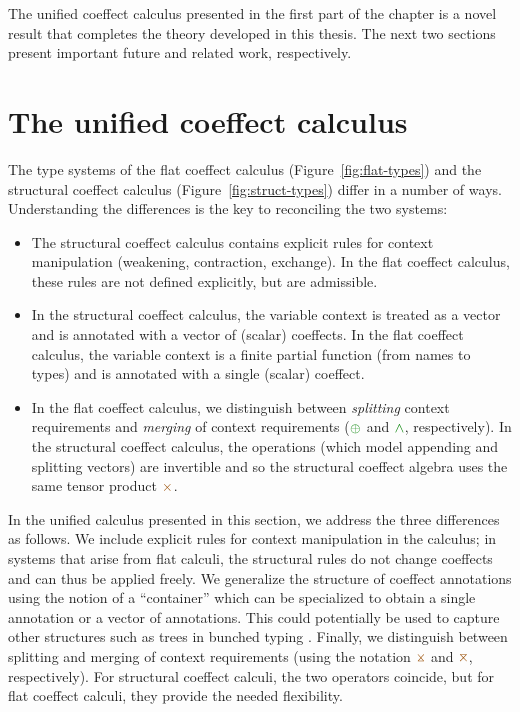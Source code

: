\noindent
The unified coeffect calculus presented in the first part of the chapter is a novel result that
completes the theory developed in this thesis. The next two sections present important future and
related work, respectively.


\section{The unified coeffect calculus}
\label{sec:further-unified}

The type systems of the flat coeffect calculus (Figure~\ref{fig:flat-types}) and the structural
coeffect calculus (Figure~\ref{fig:struct-types}) differ in a number of ways. Understanding the
differences is the key to reconciling the two systems:

\begin{itemize}
\item The structural coeffect calculus contains explicit rules for context manipulation
  (weakening, contraction, exchange). In the flat coeffect calculus, these rules are not defined
  explicitly, but are admissible.

\item In the structural coeffect calculus, the variable context is treated as a vector
  and is annotated with a vector of (scalar) coeffects. In the flat coeffect calculus,
  the variable context is a finite partial function (from names to types) and is annotated with
  a single (scalar) coeffect.

\item In the flat coeffect calculus, we distinguish between \emph{splitting} context requirements
  and \emph{merging} of context requirements ($\cpar$ and $\czip$, respectively). In the structural
  coeffect calculus, the operations (which model appending and splitting vectors) are invertible
  and so the structural coeffect algebra uses the same tensor product $\atimes$.
\end{itemize}

\noindent
In the unified calculus presented in this section, we address the three differences as follows.
We include explicit rules for context manipulation in the calculus; in systems that arise from flat
calculi, the structural rules do not change coeffects and can thus be applied freely. We generalize
the structure of coeffect annotations using the notion of a ``container'' which can be specialized
to obtain a single annotation or a vector of annotations. This could potentially be used to capture
other structures such as trees in bunched typing \cite{substruct-bunched}. Finally, we distinguish
between splitting and merging of context requirements (using the notation $\apar$ and $\azip$,
respectively). For structural coeffect calculi, the two operators coincide, but for flat
coeffect calculi, they provide the needed flexibility.


